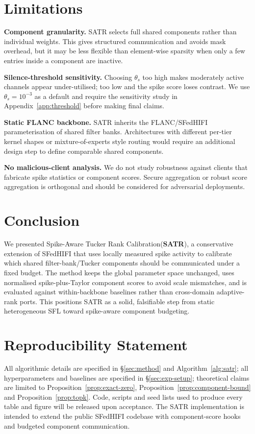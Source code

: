 \documentclass{article} %
\newcommand{\method}{SATR\xspace}
\newcommand{\methodbf}{\textbf{SATR}}
\newcommand{\methodfull}{Spike-Aware Tucker Rank Calibration\xspace}
\begin{document}
\section{Limitations}
\label{sec:limitations}

\textbf{Component granularity.} \method selects full shared components rather than individual weights. This gives structured communication and avoids mask overhead, but it may be less flexible than element-wise sparsity when only a few entries inside a component are inactive.

\textbf{Silence-threshold sensitivity.} Choosing $\theta_s$ too high makes moderately active channels appear under-utilised; too low and the spike score loses contrast. We use $\theta_s = 10^{-3}$ as a default and require the sensitivity study in Appendix~\ref{app:threshold} before making final claims.

\textbf{Static FLANC backbone.} \method inherits the FLANC/SFedHIFI parameterisation of shared filter banks. Architectures with different per-tier kernel shapes or mixture-of-experts style routing would require an additional design step to define comparable shared components.

\textbf{No malicious-client analysis.} We do not study robustness against clients that fabricate spike statistics or component scores. Secure aggregation or robust score aggregation is orthogonal and should be considered for adversarial deployments.

\section{Conclusion}
\label{sec:conclusion}

We presented \methodfull (\methodbf), a conservative extension of SFedHIFI that uses locally measured spike activity to calibrate which shared filter-bank/Tucker components should be communicated under a fixed budget. The method keeps the global parameter space unchanged, uses normalised spike-plus-Taylor component scores to avoid scale mismatches, and is evaluated against within-backbone baselines rather than cross-domain adaptive-rank ports. This positions \method as a solid, falsifiable step from static heterogeneous SFL toward spike-aware component budgeting.

\section*{Reproducibility Statement}
All algorithmic details are specified in \S\ref{sec:method} and Algorithm~\ref{alg:satr}; all hyperparameters and baselines are specified in \S\ref{sec:exp-setup}; theoretical claims are limited to Proposition~\ref{prop:exact-zero}, Proposition~\ref{prop:component-bound} and Proposition~\ref{prop:topk}. Code, scripts and seed lists used to produce every table and figure will be released upon acceptance. The \method implementation is intended to extend the public SFedHIFI codebase with component-score hooks and budgeted component communication.
\end{document}
